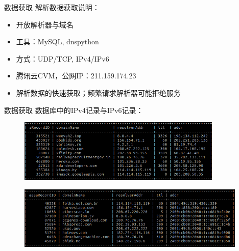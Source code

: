 \documentclass{beamer}
\begin{document}
\begin{frame}{数据获取}
解析数据获取说明：
  \begin{itemize}
    \item 开放解析器与域名
    \item 工具：MySQL, dnspython
    \item 方式：UDP/TCP, IPv4/IPv6
    \item 腾讯云CVM，公网IP：211.159.174.23
    \item 解析数据的快速获取；频繁请求解析器可能拒绝服务
  \end{itemize}
  \end{frame}
\begin{frame}{数据获取}
  数据库中的IPv4记录与IPv6记录：
  \begin{figure}
    \includegraphics[height=3cm]{images/ipv4sjk.png}
    \end{figure}
    \begin{figure}
      \includegraphics[height=3cm]{images/ipv6sjk.png}
      \end{figure}
\end{frame}
\end{document}
